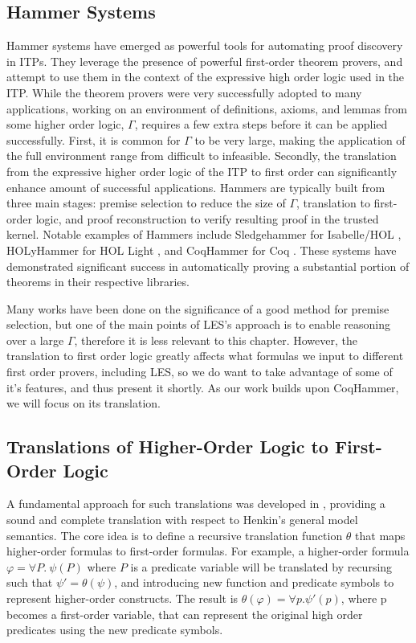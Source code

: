 \subsection{Hammer Systems}

Hammer systems have emerged as powerful tools for automating proof discovery in ITPs. 
They leverage the presence of powerful first-order theorem provers, and attempt to use them in the context of the expressive high order logic used in the ITP.
While the theorem provers were very successfully adopted to many applications, working on an environment of definitions, axioms, and lemmas from some higher order logic, $\Gamma$, requires a few extra steps before it can be applied successfully.
First, it is common for $\Gamma$ to be very large, making the application of the full environment range from difficult to infeasible.
Secondly, the translation from the expressive higher order logic of the ITP to first order can significantly enhance amount of successful applications.
Hammers are typically built from three main stages: premise selection to reduce the size of $\Gamma$, translation to first-order logic, and proof reconstruction to verify resulting proof in the trusted kernel.
Notable examples of Hammers include Sledgehammer for Isabelle/HOL \cite{sledgehammer}, HOLyHammer for HOL Light \cite{holyhammer}, and CoqHammer for Coq \cite{coqhammer}. 
These systems have demonstrated significant success in automatically proving a substantial portion of theorems in their respective libraries.

Many works have been done on the significance of a good method for premise selection, but one of the main points of LES's approach is to enable reasoning over a large $\Gamma$, therefore it is less relevant to this chapter.
However, the translation to first order logic greatly affects what formulas we input to different first order provers, including LES, so we do want to take advantage of some of it's features, and thus present it shortly.
As our work builds upon CoqHammer, we will focus on its translation.

\subsection{Translations of Higher-Order Logic to First-Order Logic}

A fundamental approach for such translations was developed in \cite{kerber1990provecompleteembedding}, providing a sound and complete translation with respect to Henkin's general model semantics.
The core idea is to define a recursive translation function $\theta$ that maps higher-order formulas to first-order formulas. 
For example, a higher-order formula $\varphi = \forall P.~\psi(P)$ where $P$ is a predicate variable will be translated by recursing such that $\psi' = \theta(\psi)$, and introducing  new function and predicate symbols to represent higher-order constructs.
The result is $\theta(\varphi) = \forall p.\psi'(p)$, where p becomes a first-order variable, that can represent the original high order predicates using the new predicate symbols.

